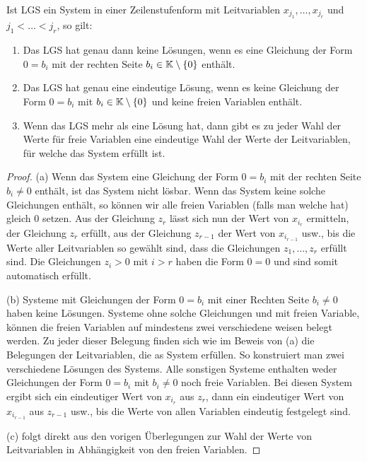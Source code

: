 \begin{appendices}
\begin{propn}
	Ist LGS ein System in einer Zeilenstufenform mit Leitvariablen $x_{j_1},\ldots,x_{j_r}$ und $j_1 < \ldots < j_r$, so gilt: 
	\begin{enumerate}[label=(\alph*)]
		\item Das  LGS hat genau dann keine Lösungen, wenn es eine Gleichung der Form $0=b_i$ mit der rechten Seite $b_i \in \mathbb K \setminus \{0\}$ enthält. 
		\item Das LGS hat genau eine eindeutige Lösung, wenn es keine Gleichung der Form $0 = b_i$ mit $b_i \in \mathbb K \setminus \{0\}$ und keine freien Variablen enthält.
		\item Wenn das LGS mehr als eine Lösung hat, dann gibt es zu jeder Wahl der Werte für freie Variablen eine eindeutige Wahl der Werte der Leitvariablen, für welche das System erfüllt ist. 
	\end{enumerate}
\end{propn}
\begin{proof}
	(a) Wenn das System eine Gleichung der Form $0 = b_i$ mit der rechten Seite $b_i \ne 0$ enthält, ist das System nicht lösbar. Wenn das System keine solche Gleichungen enthält, so können wir alle freien Variablen (falls man welche hat) gleich $0$ setzen. Aus der Gleichung $z_r$ lässt sich nun der Wert von $x_{i_r}$ ermitteln, der Gleichung $z_r$ erfüllt, aus der Gleichung $z_{r-1}$ der Wert von $x_{i_{r-1}}$ usw., bis die Werte aller Leitvariablen so gewählt sind, dass die Gleichungen $z_1,\ldots,z_r$ erfüllt sind. Die Gleichungen $z_i> 0$ mit $i > r$ haben die Form $0=0$ und sind somit automatisch erfüllt. 
	
	(b) Systeme mit Gleichungen der Form $0 = b_i$ mit einer Rechten Seite $b_i \ne 0$ haben keine Lösungen. Systeme ohne solche Gleichungen und mit freien Variable, können die freien Variablen auf mindestens zwei verschiedene weisen belegt werden. Zu jeder dieser Belegung finden sich wie im Beweis von (a) die Belegungen der Leitvariablen, die as System erfüllen. So konstruiert man zwei verschiedene Lösungen des Systems. Alle sonstigen Systeme enthalten weder Gleichungen der Form $0 =b_i$ mit $b_i \ne 0$ noch freie Variablen. Bei diesen System ergibt sich ein eindeutiger Wert von $x_{i_r}$ aus $z_r$, dann ein eindeutiger Wert von $x_{i_{r-1}}$ aus $z_{r-1}$ usw., bis die Werte von allen Variablen eindeutig festgelegt sind. 
	
	(c) folgt direkt aus den vorigen Überlegungen zur Wahl der Werte von Leitvariablen in Abhängigkeit von den freien Variablen.
\end{proof}


\end{appendices}
